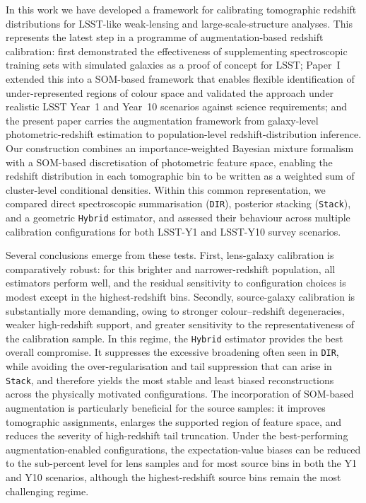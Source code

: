 In this work we have developed a framework for calibrating tomographic redshift distributions for LSST-like weak-lensing and large-scale-structure analyses. This represents the latest step in a programme of augmentation-based redshift calibration: \citet{2024ApJ...967L...6M} first demonstrated the effectiveness of supplementing spectroscopic training sets with simulated galaxies as a proof of concept for LSST; Paper~I extended this into a SOM-based framework that enables flexible identification of under-represented regions of colour space and validated the approach under realistic LSST Year~1 and Year~10 scenarios against science requirements; and the present paper carries the augmentation framework from galaxy-level photometric-redshift estimation to population-level redshift-distribution inference. Our construction combines an importance-weighted Bayesian mixture formalism with a SOM-based discretisation of photometric feature space, enabling the redshift distribution in each tomographic bin to be written as a weighted sum of cluster-level conditional densities. Within this common representation, we compared direct spectroscopic summarisation (\texttt{DIR}), posterior stacking (\texttt{Stack}), and a geometric \texttt{Hybrid} estimator, and assessed their behaviour across multiple calibration configurations for both LSST-Y1 and LSST-Y10 survey scenarios.

Several conclusions emerge from these tests. First, lens-galaxy calibration is comparatively robust: for this brighter and narrower-redshift population, all estimators perform well, and the residual sensitivity to configuration choices is modest except in the highest-redshift bins. Secondly, source-galaxy calibration is substantially more demanding, owing to stronger colour--redshift degeneracies, weaker high-redshift support, and greater sensitivity to the representativeness of the calibration sample. In this regime, the \texttt{Hybrid} estimator provides the best overall compromise. It suppresses the excessive broadening often seen in \texttt{DIR}, while avoiding the over-regularisation and tail suppression that can arise in \texttt{Stack}, and therefore yields the most stable and least biased reconstructions across the physically motivated configurations. The incorporation of SOM-based augmentation is particularly beneficial for the source samples: it improves tomographic assignments, enlarges the supported region of feature space, and reduces the severity of high-redshift tail truncation. Under the best-performing augmentation-enabled configurations, the expectation-value biases can be reduced to the sub-percent level for lens samples and for most source bins in both the Y1 and Y10 scenarios, although the highest-redshift source bins remain the most challenging regime.


